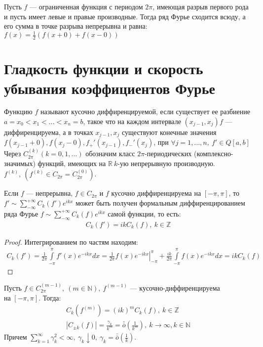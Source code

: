 \begin{consequence}
  Пусть $f$ --- ограниченная функция с периодом $2\pi$, имеющая разрыв первого
  рода и пусть имеет левые и правые производные. Тогда ряд Фурье сходится
  всюду, а его сумма в точке разрыва непрерывна и равна: $f(x) =
  \frac{1}{2}(f(x+0) + f(x-0))$
\end{consequence}

\section{Гладкость функции и скорость убывания коэффициентов Фурье}
\begin{definition}
  Функцию $f$ называют кусочно диффиренцируемой, если существует ее разбиение
  $a = x_0 < x_1 < \dots < x_n = b$, такое что на каждом интервале $(x_{j-1},
  x_j) f$ --- диффиренцируема, а в точках $x_{j-1}, x_j$ существуют конечные
  значения $f(x_{j-1}+0), f(x_j-0), f_+'(x_{j-1}), f_-'(x_j)$, при $\forall j =
  1, \dots, n, \ f' \in Q[a,b]$ \\
  Через $C_{2\pi}^{(k)} (k = 0, 1, \dots)$ обозначим класс $2\pi$-периодических
  (комплексно-значимых) функций, имеющих на $\mathbb{R} \ k$-ую непрерывную
  производную. $f^{(k)}, \ (f^{(k)} \in C_{2\pi} = C_{2\pi}^{(0)})$.
\end{definition}

\begin{lemma}
  Если $f$ --- непрерывна, $f \in C_{2\pi}$ и $f$ кусочно диффиренцируема на
  $[-\pi, \pi]$, то $f' \sim \sum\limits_{-\infty}^{+\infty} C_k(f') e^{ikx}$
  может быть получен формальным диффиренцированием ряда Фурье $f \sim
  \sum\limits_{-\infty}^{+\infty} C_k(f) e^{ikx}$ самой функции, то есть:
  \begin{gather}
    C_k(f') = ikC_k(f), \ k \in \mathbb{Z}
    \label{lem471:eq1}
  \end{gather}
\end{lemma}

\begin{proof}
  Интегрированием по частям находим:
  \begin{gather*}
    C_k(f') = \frac{1}{2\pi} \int\limits_{-\pi}^\pi f'(x) e^{-ikx} dx =
    \left. \frac{1}{2\pi} f(x) e^{-ikx} \right|_{-\pi}^\pi + \frac{ik}{2\pi}
    \int\limits_{-\pi}^\pi f(x) e^{-ikx} dx = ikC_k(f)
  \end{gather*}
\end{proof}

\begin{theorem}
  Пусть $f \in C_{2\pi}^{(m-1)}, \ (m \in \mathbb{N}), \ f^{(m-1)}$ ---
  кусочно-диффиренцируема \\ на $[-\pi, \pi]$. Тогда:
  \begin{gather}
    C_k(f^{(m)}) = (ik)^m C_k(f), \ k \in \mathbb{Z}
    \label{th471:eq1} \\
    |C_{\pm k}(f)| = \frac{\gamma_k}{k^m} =
    \bar{\bar{o}}\left(\frac{1}{k^m}\right), \ k
    \to \infty, k \in \mathbb{N}
    \label{th471:eq2}
  \end{gather}
  Причем $\sum\limits_{k = 1}^{\infty} \gamma_k^2 < \infty, \ \gamma_k \downarrow
  0, \ \gamma_k = \bar{\bar{o}}\left(\frac{1}{k}\right)$.
\end{theorem}

